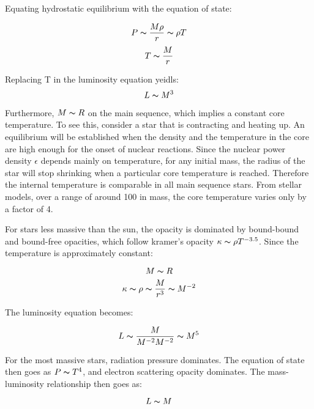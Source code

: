 Equating hydrostatic equilibrium with the equation of state:

\begin{equation}
P \thicksim \frac{M\rho}{r} \thicksim \rho T
\end{equation}
\begin{equation}
T \thicksim \frac{M}{r}
\end{equation}

Replacing T in the luminosity equation yeidls:
\begin{equation}
L \thicksim M^3
\end{equation}

Furthermore, $M \thicksim R$ on the main sequence, which implies a constant core temperature.  To see this, consider a star that is contracting and heating up.  An equilibrium will be established when the density and the temperature in the core are high enough for the onset of nuclear reactions.  Since the nuclear power density $\epsilon$ depends mainly on temperature, for any initial mass, the radius of the star will stop shrinking when a particular core temperature is reached.  Therefore the internal temperature is comparable in all main sequence stars.  From stellar models, over a range of around 100 in mass, the core temperature varies only by a factor of 4.  

For stars less massive than the sun, the opacity is dominated by bound-bound and bound-free opacities, which follow kramer's opacity $\kappa \thicksim \rho T^{-3.5}$.  Since the temperature is approximately constant:

\begin{equation}
 M \thicksim R
\end{equation}
\begin{equation}
\kappa \thicksim \rho \thicksim \frac{M}{r^3} \thicksim M^{-2}
\end{equation}

The luminosity equation becomes:

\begin{equation}
L \thicksim \frac{M}{M^{-2}M^{-2}} \thicksim M^{5}
\end{equation}

For the most massive stars, radiation pressure dominates.  The equation of state then goes as $P \thicksim T^4$, and electron scattering opacity dominates.  The mass-luminosity relationship then goes as:

\begin{equation}
L \thicksim M
\end{equation}





